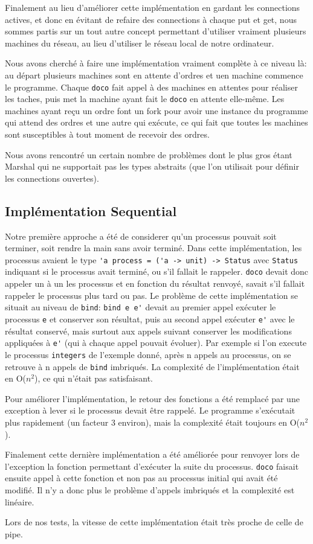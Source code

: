 \documentclass[a4paper]{article}
\begin{document}
Finalement au lieu d'améliorer cette implémentation en gardant les
connections actives, et donc en évitant de refaire des connections à chaque
put et get, nous sommes partis sur un tout autre concept permettant
d'utiliser vraiment plusieurs machines du réseau, au lieu d'utiliser le
réseau local de notre ordinateur.

Nous avons cherché à faire une implémentation vraiment complète à ce niveau
là: au départ plusieurs machines sont en attente d'ordres et uen machine
commence le programme. Chaque \verb!doco! fait appel à des machines en
attentes pour réaliser les taches, puis met la machine ayant fait le
\verb!doco! en attente elle-même. Les machines ayant reçu un ordre font un
fork pour avoir une instance du programme qui attend des ordres et une
autre qui exécute, ce qui fait que toutes les machines sont susceptibles à
tout moment de recevoir des ordres. 

Nous avons rencontré un certain nombre de problèmes dont le plus gros étant Marshal qui ne
supportait pas les types abstraits (que l'on utilisait pour définir les
connections ouvertes). 



\subsection{Implémentation Sequential}
Notre première approche a été de considerer qu'un processus pouvait soit
terminer, soit rendre la main sans avoir terminé. Dans cette
implémentation, les processus avaient le type \verb!'a process = ('a -> unit) -> Status! avec \verb!Status! indiquant si le processus avait terminé, ou s'il fallait le rappeler. \verb!doco! devait donc appeler un à un les processus et en fonction du résultat renvoyé, savait s'il fallait rappeler le processus plus tard ou pas. 
Le problème de cette implémentation se situait au niveau de \verb!bind!:
\verb!bind e e'! devait au premier appel exécuter le processus \verb!e! et conserver son résultat, puis au second appel exécuter \verb!e'! avec le résultat conservé, mais surtout aux appels suivant conserver les modifications appliquées à \verb!e'! (qui à chaque appel pouvait évoluer). Par exemple si l'on execute le processus \verb!integers! de l'exemple donné, après n appels au processus, on se retrouve à n appels de \verb!bind! imbriqués. La complexité de l'implémentation était en O($n^2$), ce qui n'était pas satisfaisant.

Pour améliorer l'implémentation, le retour des fonctions a été remplacé par
une exception à lever si le processus devait être rappelé. Le programme
s'exécutait plus rapidement (un facteur 3 environ), mais la complexité était toujours en O($n^2$).

Finalement cette dernière implémentation a été améliorée pour renvoyer lors
de l'exception la fonction permettant d'exécuter la suite du
processus. \verb!doco! faisait ensuite appel à cette fonction et non pas au processus initial qui avait été modifié. Il n'y a donc plus le problème d'appels imbriqués et la complexité est linéaire.

Lors de nos tests, la vitesse de cette implémentation était très proche de celle de pipe.
\end{document}
